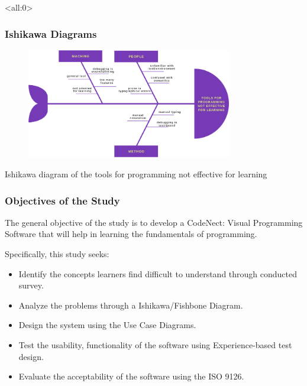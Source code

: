 \documentclass[handout]{beamer}
\newcommand{\parx}{
	\setlength{\parindent}{4em}
	\par}
\begin{document}
\begin{frame}<all:0>
	\frametitle{Ishikawa Diagrams}
	\begin{figure}
		\includegraphics[width=0.8\textwidth]{figures/fishbone3.png}
	\end{figure}
	\centering
	Ishikawa diagram of the tools for programming not effective for learning
\end{frame}

\begin{frame}
	\frametitle{Objectives of the Study}
	\justifying
	\parx
	The general objective of the study is to develop a CodeNect: Visual Programming
	Software that will help in learning the fundamentals of programming.

	\parx
	Specifically, this study seeks:

	\begin{itemize}
		\item<1-> Identify the concepts learners find difficult to understand through conducted survey.
		\item<2-> Analyze the problems through a Ishikawa/Fishbone Diagram.
		\item<3-> Design the system using the Use Case Diagrams.
		\item<4-> Test the usability, functionality of the software using Experience-based test design.
		\item<5-> Evaluate the acceptability of the software using the ISO 9126.
	\end{itemize}
\end{frame}
\end{document}
